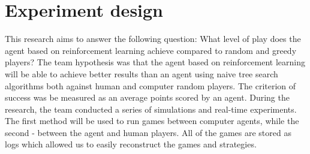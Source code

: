 \section{Experiment design}
This research aims to answer the following question:
What level of play does the agent based on reinforcement learning achieve compared to random and greedy players?
The team hypothesis was that the agent based on reinforcement learning will be 
able to achieve better results than an agent using naive tree search algorithms 
both against human and computer random players. The criterion of success was 
be measured as an average points scored by an agent.
During the research, the team conducted a series of simulations and real-time experiments. 
The first method will be used to run games between computer agents, while the second 
- between the agent and human players.  All of the games are stored as logs 
which allowed us to easily reconstruct the games and strategies.

